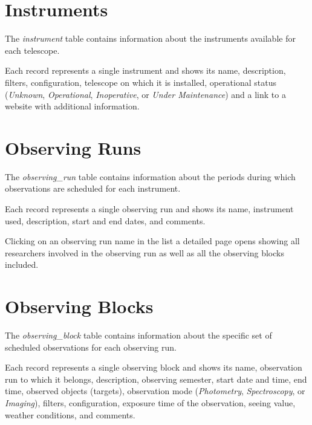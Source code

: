 \section{Instruments}

The \textsl{instrument} table contains information about the instruments available for each telescope. 

Each record represents a single instrument and shows its name, description, filters, configuration, telescope on which it is installed, operational status (\textsl{Unknown}, \textsl{Operational}, \textsl{Inoperative}, or \textsl{Under Maintenance}) and a link to a website with additional information. 



\section{Observing Runs}

The \textsl{observing\_run} table contains information about the periods during which observations are scheduled for each instrument. 

Each record represents a single observing run and shows its name, instrument used, description, start and end dates, and comments.


Clicking on an observing run name in the list a detailed page opens showing all researchers involved in the observing run as well as all the observing blocks included.


\section{Observing Blocks}

The \textsl{observing\_block} table contains information about the specific set of scheduled observations for each observing run. 

Each record represents a single observing block and shows its name, observation run to which it belongs, description, observing semester, start date and time, end time, observed objects (targets), observation mode (\textsl{Photometry}, \textsl{Spectroscopy}, or \textsl{Imaging}), filters, configuration, exposure time of the observation, seeing value, weather conditions, and comments.

